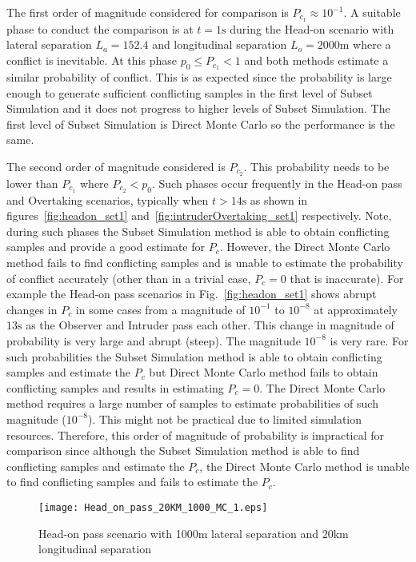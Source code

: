\documentclass[journal]{IEEEtran}
\begin{document}
The first order of magnitude considered for comparison is $P_{c_{1}} \approx 10^{-1}$. A suitable phase to conduct the comparison is at $t = 1\text{s}$ during the Head-on scenario with lateral separation $L_{a} = 152.4$ and longitudinal separation $L_{o} = 2000\text{m}$ where a conflict is inevitable. At this phase $p_{0} \leq P_{c_{1}} < 1$ and both methods estimate a similar probability of conflict. This is as expected since the probability is large enough to generate sufficient conflicting samples in the first level of Subset Simulation and it does not progress to higher levels of Subset Simulation. The first level of Subset Simulation is Direct Monte Carlo so the performance is the same.

The second order of magnitude considered is $P_{c_{2}}$. This probability needs to be lower than $P_{c_{1}}$ where $P_{c_{2}} < p_{0}$. Such phases occur frequently in the Head-on pass and Overtaking scenarios, typically when $t > 14 \text{s}$ as shown in figures~\ref{fig:headon_set1} and~\ref{fig:intruderOvertaking_set1} respectively. Note, during such phases the Subset Simulation method is able to obtain conflicting samples and provide a good estimate for $P_{c}$. However, the Direct Monte Carlo method fails to find conflicting samples and is unable to estimate the probability of conflict accurately (other than in a trivial case, $P_{c} = 0$ that is inaccurate). For example the Head-on pass scenarios in Fig.~\ref{fig:headon_set1} shows abrupt changes in $P_{c}$ in some cases from a magnitude of $10^{-1}$ to $10^{-8}$ at approximately $13 \text{s}$ as the Observer and Intruder pass each other. This change in magnitude of probability is very large and abrupt (steep). The magnitude $10^{-8}$ is very rare. For such probabilities the Subset Simulation method is able to obtain conflicting samples and estimate the $P_{c}$ but Direct Monte Carlo method fails to obtain conflicting samples and results in estimating $P_{c} = 0$. The Direct Monte Carlo method requires a large number of samples to estimate probabilities of such magnitude ($10^{-8}$). This might not be practical due to limited simulation resources. Therefore, this order of magnitude of probability is impractical for comparison since although the Subset Simulation method is able to find conflicting samples and estimate the $P_{c}$, the Direct Monte Carlo method is unable to find conflicting samples and fails to estimate the $P_{c}$.

\begin{figure}\centering
	\texttt{[image: Head\_on\_pass\_20KM\_1000\_MC\_1.eps]}
	\caption{Head-on pass scenario with 1000m lateral separation and 20km longitudinal separation}
	\label{fig:headon_long}
\end{figure}
\end{document}

